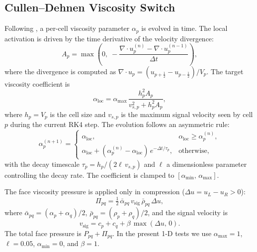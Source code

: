 \documentclass[twocolumn]{aastex63}
\newcommand{\vel}{{u}}
\begin{document}
\subsection{Cullen--Dehnen Viscosity Switch}

Following \citet{cullen2010}, a per-cell viscosity parameter
$\alpha_p$ is evolved in time.
The local activation is driven by the time derivative of the velocity
divergence:
\begin{equation}
  A_p = \max\!\left(0,\;
    -\frac{\nabla\!\cdot\!\vel_p^{(n)} - \nabla\!\cdot\!\vel_p^{(n-1)}}
          {\Delta t}\right),
\end{equation}
where the divergence is computed as
$\nabla\!\cdot\!\vel_p = (\vel_{p+\frac{1}{2}} - \vel_{p-\frac{1}{2}})/V_p$.
The target viscosity coefficient is
\begin{equation}\label{eq:alphaloc}
  \alpha_\mathrm{loc} = \alpha_\mathrm{max}\,
    \frac{h_p^2 A_p}{v_{s,p}^2 + h_p^2 A_p},
\end{equation}
where $h_p = V_p$ is the cell size and $v_{s,p}$ is the maximum signal
velocity seen by cell $p$ during the current RK4 step.
The evolution follows an asymmetric rule:
\begin{equation}\label{eq:alphacd}
  \alpha_p^{(n+1)} = \begin{cases}
    \alpha_\mathrm{loc}, & \alpha_\mathrm{loc} \ge \alpha_p^{(n)},\\[4pt]
    \alpha_\mathrm{loc} + (\alpha_p^{(n)} - \alpha_\mathrm{loc})\,
      e^{-\Delta t / \tau_p}, & \text{otherwise},
  \end{cases}
\end{equation}
with the decay timescale $\tau_p = h_p / (2\ell\,v_{s,p})$ and
$\ell$ a dimensionless parameter controlling the decay rate.
The coefficient is clamped to $[\alpha_\mathrm{min},\,\alpha_\mathrm{max}]$.

The face viscosity pressure is applied only in compression
($\Delta\vel = \vel_L - \vel_R > 0$):
\begin{equation}
  \Pi_{pq} = \tfrac{1}{2}\,\bar\alpha_{pq}\,v_{\mathrm{sig}}\,
    \bar\rho_{pq}\,\Delta\vel,
\end{equation}
where $\bar\alpha_{pq} = (\alpha_p + \alpha_q)/2$,
$\bar\rho_{pq} = (\rho_p+\rho_q)/2$, and the signal velocity is
\begin{equation}
  v_{\mathrm{sig}} = c_p + c_q + \beta\,\max(\Delta\vel,\,0).
\end{equation}
The total face pressure is $P_{pq} + \Pi_{pq}$.
In the present 1-D tests we use $\alpha_\mathrm{max}=1$,
$\ell=0.05$, $\alpha_\mathrm{min}=0$, and $\beta=1$.
\end{document}
